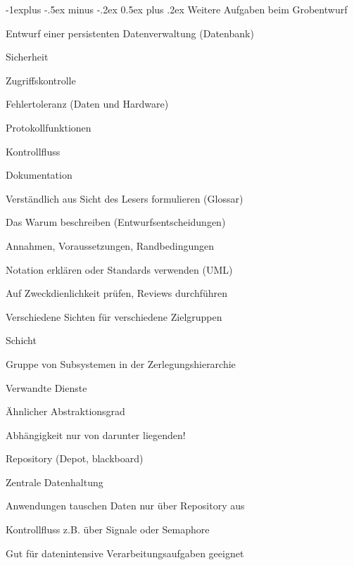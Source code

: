 \documentclass[a4paper]{article}
\makeatletter
\renewcommand{\subsection}{\@startsection{subsection}{2}{0mm}%
                                {-1explus -.5ex minus -.2ex}%
                                {0.5ex plus .2ex}%
                                {\normalfont\normalsize\bfseries}}
\makeatother
\begin{document}
\begin{multicols}{3}
  \subsection{Weitere Aufgaben beim Grobentwurf}
  \begin{itemize*}
    \item Entwurf einer persistenten Datenverwaltung (Datenbank)
    \item Sicherheit
    \begin{itemize*}
      \item Zugriffskontrolle
      \item Fehlertoleranz (Daten und Hardware)
      \item Protokollfunktionen
    \end{itemize*}
    \item Kontrollfluss
    \item Dokumentation
  \begin{itemize*}
    \item Verständlich aus Sicht des Lesers formulieren (Glossar)
    \item Das Warum beschreiben (Entwurfsentscheidungen)
    \item Annahmen, Voraussetzungen, Randbedingungen
    \item Notation erklären oder Standards verwenden (UML)
    \item Auf Zweckdienlichkeit prüfen, Reviews durchführen
    \item Verschiedene Sichten für verschiedene Zielgruppen
  \end{itemize*}
\end{itemize*}

Schicht
\begin{itemize*}
  \item Gruppe von Subsystemen in der Zerlegungshierarchie
  \item Verwandte Dienste
  \item Ähnlicher Abstraktionsgrad
  \item Abhängigkeit nur von darunter liegenden!
\end{itemize*}

Repository (Depot, blackboard)
\begin{itemize*}
  \item Zentrale Datenhaltung
  \item Anwendungen tauschen Daten nur über Repository aus
  \item Kontrollfluss z.B. über Signale oder Semaphore
  \item Gut für datenintensive Verarbeitungsaufgaben geeignet
\end{itemize*}


\end{multicols}
\end{document}
